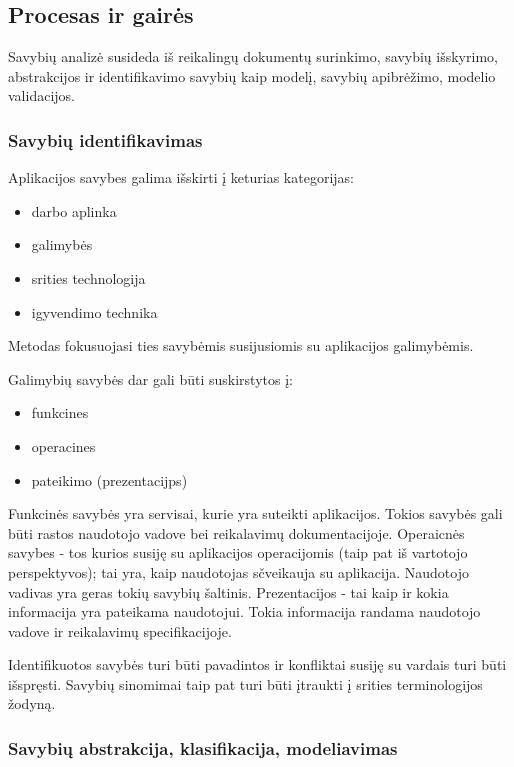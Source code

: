 \documentclass{VUMIFPSkursinis}
\begin{document}
\subsection{Procesas ir gairės}

Savybių analizė susideda iš reikalingų dokumentų surinkimo, savybių išskyrimo, abstrakcijos ir identifikavimo savybių kaip modelį, savybių apibrėžimo, modelio validacijos. 

\subsubsection{Savybių identifikavimas}

Aplikacijos savybes galima išskirti į keturias kategorijas:
\begin{itemize}
\item darbo aplinka
\item galimybės
\item srities technologija
\item igyvendimo technika
\end{itemize}

Metodas fokusuojasi ties savybėmis susijusiomis su aplikacijos galimybėmis. 

Galimybių savybės dar gali būti suskirstytos į:
\begin{itemize}
\item funkcines
\item operacines
\item pateikimo (prezentacijps)
\end{itemize}

Funkcinės savybės yra servisai, kurie yra suteikti aplikacijos. Tokios savybės gali būti rastos naudotojo vadove bei reikalavimų dokumentacijoje. Operaicnės savybes - tos kurios susiję su aplikacijos operacijomis (taip pat iš vartotojo perspektyvos); tai yra, kaip naudotojas sčveikauja su aplikacija. Naudotojo vadivas yra geras tokių savybių šaltinis. Prezentacijos - tai kaip ir kokia informacija yra pateikama naudotojui. Tokia informacija randama naudotojo vadove ir reikalavimų specifikacijoje. 

Identifikuotos savybės turi būti pavadintos ir konfliktai susiję su vardais turi būti išspręsti. Savybių sinomimai taip pat turi būti įtraukti į srities terminologijos žodyną.

\subsubsection{Savybių abstrakcija, klasifikacija, modeliavimas}
\end{document}
